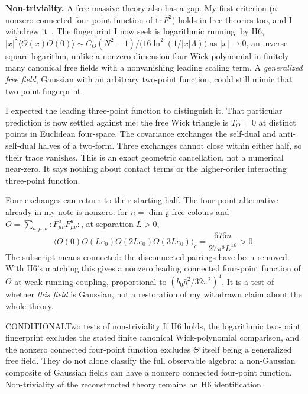 \textbf{Non-triviality.} A free massive theory also has a gap. My first criterion (a nonzero connected four-point function of
$\mathrm{tr}\,F^2$) holds in free theories too, and I withdrew it~\cite{ClosedSet}. The fingerprint I now seek is logarithmic
running: by H6, $|x|^8\langle\Theta(x)\Theta(0)\rangle\sim C_O(N^2-1)/\bigl(16\ln^2(1/|x|\Lambda)\bigr)$ as
$|x|\to0$, an inverse square logarithm, unlike a nonzero dimension-four Wick polynomial in finitely many canonical
free fields with a nonvanishing leading scaling term. A \emph{generalized free field}, Gaussian with an arbitrary
two-point function, could still mimic that two-point fingerprint.

I expected the leading three-point function to distinguish it. That particular prediction is now settled against
me: the free Wick triangle is $T_O=0$ at distinct points in Euclidean four-space. The covariance exchanges the
self-dual and anti-self-dual halves of a two-form. Three exchanges cannot close within either half, so their
trace vanishes. This is an exact geometric cancellation, not a numerical near-zero. It says nothing about
contact terms or the higher-order interacting three-point function.

Four exchanges can return to their starting half. The four-point alternative already in my note is nonzero:
for $n=\dim\mathfrak g$ free colours and $O=\sum_{a,\mu,\nu}:F^a_{\mu\nu}F^a_{\mu\nu}:$, at separation $L>0$,
\[
\langle O(0)O(Le_0)O(2Le_0)O(3Le_0)\rangle_c
=\frac{676n}{27\pi^8L^{16}}>0.
\]
The subscript means connected: the disconnected pairings have been removed. With H6's matching this gives a
nonzero leading connected four-point function of $\Theta$ at weak running coupling, proportional to
$(b_0\bar g^2/32\pi^2)^4$. It is a test of whether \emph{this field} is Gaussian, not a restoration of my withdrawn
claim about the whole theory.

\begin{claim}{CONDITIONAL}{Two tests of non-triviality}\label{b:nontrivial}
If H6 holds, the logarithmic two-point fingerprint excludes the stated finite canonical Wick-polynomial comparison,
and the nonzero connected four-point function excludes $\Theta$ itself being a generalized free field.
They do not alone classify the full observable algebra: a non-Gaussian composite of Gaussian fields can have
a nonzero connected four-point function. Non-triviality of the reconstructed theory remains an H6 identification.
\end{claim}

